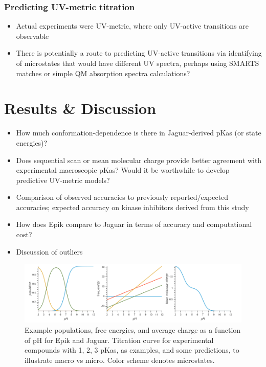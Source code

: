 \documentclass[9pt,lineno]{elife}
\begin{document}
\subsubsection{Predicting UV-metric titration}
\begin{itemize}
    \item Actual experiments were UV-metric, where only UV-active transitions are observable
    \item There is potentially a route to predicting UV-active transitions via identifying of microstates that would have different UV spectra, perhaps using SMARTS matches or simple QM absorption spectra calculations?
\end{itemize}

\section{Results \& Discussion}
\begin{itemize}
    \item How much conformation-dependence is there in Jaguar-derived pKas (or state energies)?
    \item Does sequential scan or mean molecular charge provide better agreement with experimental macroscopic pKas? Would it be worthwhile to develop predictive UV-metric models?
    \item Comparison of observed accuracies to previously reported/expected accuracies; expected accuracy on kinase inhibitors derived from this study
    \item How does Epik compare to Jaguar in terms of accuracy and computational cost?
    \item Discussion of outliers
\end{itemize}

\begin{figure}[H]
    \centering
    \includegraphics[width=\textwidth]{titration_curve_example.png}
    \caption{Example populations, free energies, and average charge as a function of pH for Epik and Jaguar. Titration curve for experimental compounds with 1, 2, 3 pKas, as examples, and some predictions, to illustrate macro vs micro. Color scheme denotes microstates.}
    \label{fig:titrationcurve}
\end{figure}
\end{document}
